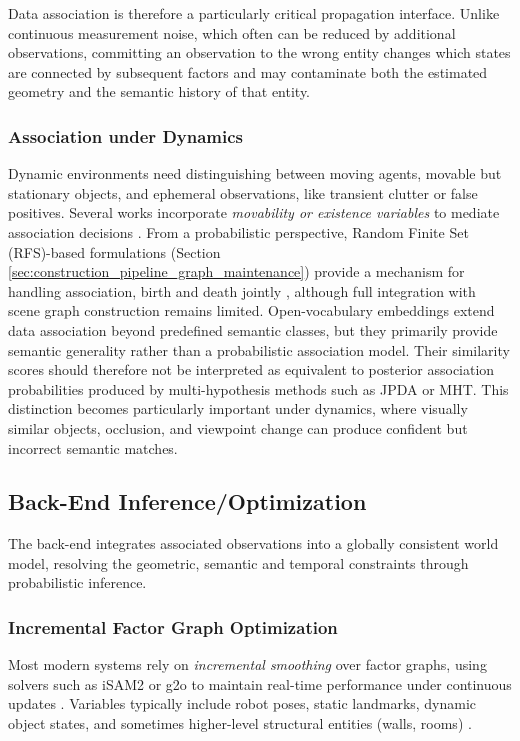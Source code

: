 Data association is therefore a particularly critical propagation interface.
Unlike continuous measurement noise, which often can be reduced by additional observations, committing an observation to the wrong entity changes which states are connected by subsequent factors and may contaminate both the estimated geometry and the semantic history of that entity.

\subsubsection{Association under Dynamics}
Dynamic environments need distinguishing between moving agents, movable but stationary objects, and ephemeral observations, like transient clutter or false positives.
Several works incorporate \textit{movability or existence variables} to mediate association decisions \cite{brink_using_2016} \cite{gomez_object-based_2020}.  
From a probabilistic perspective, Random Finite Set (RFS)-based formulations (Section \ref{sec:construction_pipeline_graph_maintenance}) provide a mechanism for handling association, birth and death jointly \cite{ristic2013tutorial} \cite{garcia2018poisson}, although full integration with scene graph construction remains limited.
Open-vocabulary embeddings extend data association beyond predefined semantic classes, but they primarily provide semantic generality rather than a probabilistic association model. 
Their similarity scores should therefore not be interpreted as equivalent to posterior association probabilities produced by multi-hypothesis methods such as JPDA or MHT. This distinction becomes particularly important under dynamics, where visually similar objects, occlusion, and viewpoint change can produce confident but incorrect semantic matches.

\subsection{Back-End Inference/Optimization}\label{sec:construction_pipeline_backend}
The back-end integrates associated observations into a globally consistent world model, resolving the geometric, semantic and temporal constraints through probabilistic inference.

\subsubsection{Incremental Factor Graph Optimization}
Most modern systems rely on \textit{incremental smoothing} over factor graphs, using solvers such as iSAM2 \cite{kaess2011isam2} or g2o \cite{kummerle_g2o_2011} to maintain real-time performance under continuous updates \cite{dellaert_factor_2017} \cite{morris_dynosam_2025} \cite{bavle_situational_2022}.
Variables typically include robot poses, static landmarks, dynamic object states, and sometimes higher-level structural entities (walls, rooms) \cite{bavle_s-graphs_2025}.

